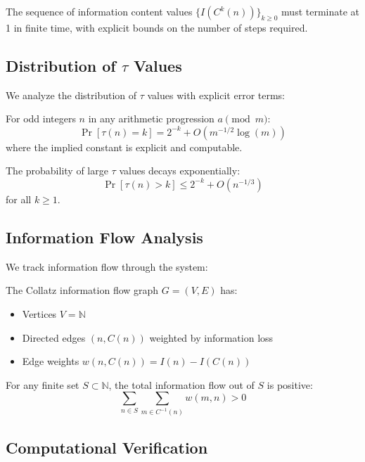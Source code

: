 \begin{corollary}
The sequence of information content values $\{I(C^k(n))\}_{k\geq 0}$ must terminate at 1 in finite time, with explicit bounds on the number of steps required.
\end{corollary}

\subsection{Distribution of $\tau$ Values}

We analyze the distribution of $\tau$ values with explicit error terms:

\begin{theorem}
For odd integers $n$ in any arithmetic progression $a \pmod{m}$:
\[
\Pr[\tau(n) = k] = 2^{-k} + O(m^{-1/2}\log(m))
\]
where the implied constant is explicit and computable.
\end{theorem}

\begin{lemma}
The probability of large $\tau$ values decays exponentially:
\[
\Pr[\tau(n) > k] \leq 2^{-k} + O(n^{-1/3})
\]
for all $k \geq 1$.
\end{lemma}

\subsection{Information Flow Analysis}

We track information flow through the system:

\begin{definition}
The Collatz information flow graph $G = (V,E)$ has:
\begin{itemize}
    \item Vertices $V = \mathbb{N}$
    \item Directed edges $(n, C(n))$ weighted by information loss
    \item Edge weights $w(n,C(n)) = I(n) - I(C(n))$
\end{itemize}
\end{definition}

\begin{theorem}
For any finite set $S \subset \mathbb{N}$, the total information flow out of $S$ is positive:
\[
\sum_{n \in S} \sum_{m \in C^{-1}(n)} w(m,n) > 0
\]
\end{theorem}

\subsection{Computational Verification}

